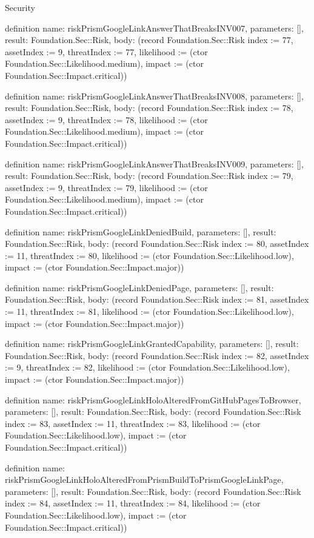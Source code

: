 \begin{lexlean}{Security}
\begin{semanticmodule}
definition{
  name: riskPrismGoogleLinkAnswerThatBreaksINV007,
  parameters: [],
  result: Foundation.Sec::Risk,
  body: (record Foundation.Sec::Risk {index := 77, assetIndex := 9, threatIndex := 77, likelihood := (ctor Foundation.Sec::Likelihood.medium), impact := (ctor Foundation.Sec::Impact.critical)})
}

definition{
  name: riskPrismGoogleLinkAnswerThatBreaksINV008,
  parameters: [],
  result: Foundation.Sec::Risk,
  body: (record Foundation.Sec::Risk {index := 78, assetIndex := 9, threatIndex := 78, likelihood := (ctor Foundation.Sec::Likelihood.medium), impact := (ctor Foundation.Sec::Impact.critical)})
}

definition{
  name: riskPrismGoogleLinkAnswerThatBreaksINV009,
  parameters: [],
  result: Foundation.Sec::Risk,
  body: (record Foundation.Sec::Risk {index := 79, assetIndex := 9, threatIndex := 79, likelihood := (ctor Foundation.Sec::Likelihood.medium), impact := (ctor Foundation.Sec::Impact.critical)})
}

definition{
  name: riskPrismGoogleLinkDeniedBuild,
  parameters: [],
  result: Foundation.Sec::Risk,
  body: (record Foundation.Sec::Risk {index := 80, assetIndex := 11, threatIndex := 80, likelihood := (ctor Foundation.Sec::Likelihood.low), impact := (ctor Foundation.Sec::Impact.major)})
}

definition{
  name: riskPrismGoogleLinkDeniedPage,
  parameters: [],
  result: Foundation.Sec::Risk,
  body: (record Foundation.Sec::Risk {index := 81, assetIndex := 11, threatIndex := 81, likelihood := (ctor Foundation.Sec::Likelihood.low), impact := (ctor Foundation.Sec::Impact.major)})
}

definition{
  name: riskPrismGoogleLinkGrantedCapability,
  parameters: [],
  result: Foundation.Sec::Risk,
  body: (record Foundation.Sec::Risk {index := 82, assetIndex := 9, threatIndex := 82, likelihood := (ctor Foundation.Sec::Likelihood.low), impact := (ctor Foundation.Sec::Impact.major)})
}

definition{
  name: riskPrismGoogleLinkHoloAlteredFromGitHubPagesToBrowser,
  parameters: [],
  result: Foundation.Sec::Risk,
  body: (record Foundation.Sec::Risk {index := 83, assetIndex := 11, threatIndex := 83, likelihood := (ctor Foundation.Sec::Likelihood.low), impact := (ctor Foundation.Sec::Impact.critical)})
}

definition{
  name: riskPrismGoogleLinkHoloAlteredFromPrismBuildToPrismGoogleLinkPage,
  parameters: [],
  result: Foundation.Sec::Risk,
  body: (record Foundation.Sec::Risk {index := 84, assetIndex := 11, threatIndex := 84, likelihood := (ctor Foundation.Sec::Likelihood.low), impact := (ctor Foundation.Sec::Impact.critical)})
}


\end{semanticmodule}
\end{lexlean}
